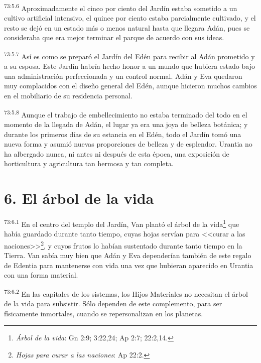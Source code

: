 \par
\textsuperscript{73:5.6} Aproximadamente el cinco por ciento del Jardín estaba sometido a un cultivo artificial intensivo, el quince por ciento estaba parcialmente cultivado, y el resto se dejó en un estado más o menos natural hasta que llegara Adán, pues se consideraba que era mejor terminar el parque de acuerdo con sus ideas.

\par
\textsuperscript{73:5.7} Así es como se preparó el Jardín del Edén para recibir al Adán prometido y a su esposa. Este Jardín habría hecho honor a un mundo que hubiera estado bajo una administración perfeccionada y un control normal. Adán y Eva quedaron muy complacidos con el diseño general del Edén, aunque hicieron muchos cambios en el mobiliario de su residencia personal.

\par
\textsuperscript{73:5.8} Aunque el trabajo de embellecimiento no estaba terminado del todo en el momento de la llegada de Adán, el lugar ya era una joya de belleza botánica; y durante los primeros días de su estancia en el Edén, todo el Jardín tomó una nueva forma y asumió nuevas proporciones de belleza y de esplendor. Urantia no ha albergado nunca, ni antes ni después de esta época, una exposición de horticultura y agricultura tan hermosa y tan completa.

\section*{6. El árbol de la vida}
\par
\textsuperscript{73:6.1} En el centro del templo del Jardín, Van plantó el árbol de la vida\footnote{\textit{Árbol de la vida}: Gn 2:9; 3:22,24; Ap 2:7; 22:2,14.} que había guardado durante tanto tiempo, cuyas hojas servían para <<curar a las naciones>>\footnote{\textit{Hojas para curar a las naciones}: Ap 22:2.}, y cuyos frutos lo habían sustentado durante tanto tiempo en la Tierra. Van sabía muy bien que Adán y Eva dependerían también de este regalo de Edentia para mantenerse con vida una vez que hubieran aparecido en Urantia con una forma material.

\par
\textsuperscript{73:6.2} En las capitales de los sistemas, los Hijos Materiales no necesitan el árbol de la vida para subsistir. Sólo dependen de este complemento, para ser físicamente inmortales, cuando se repersonalizan en los planetas.

